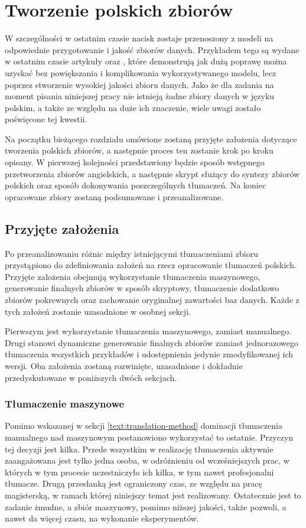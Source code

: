 \chapter{Tworzenie polskich zbiorów}
W szczególności w ostatnim czasie nacisk zostaje przenoszony z modeli na odpowiednie przygotowanie i jakość zbiorów danych. Przykładem tego są wydane w ostatnim czasie artykuły   oraz  , które demonstrują jak dużą poprawę można uzyskać bez powiększania i komplikowania wykorzystywanego modelu, lecz poprzez stworzenie wysokiej jakości zbioru danych. Jako że dla zadania  na moment pisania niniejszej pracy nie istnieją żadne zbiory danych w języku polskim, a także ze względu na duże ich znaczenie, wiele uwagi zostało poświęcone tej kwestii. 

Na początku bieżącego rozdziału omówione zostaną przyjęte założenia dotyczące tworzenia polskich zbiorów, a następnie proces ten zostanie krok po kroku opisany. W pierwszej kolejności przedstawiony będzie sposób wstępnego przetworzenia zbiorów angielskich, a następnie skrypt służący do syntezy zbiorów polskich oraz sposób dokonywania poszczególnych tłumaczeń. Na koniec opracowane zbiory zostaną podsumowane i przeanalizowane.

\section{Przyjęte założenia}
Po przeanalizowaniu różnic między istniejącymi tłumaczeniami zbioru  przystąpiono do zdefiniowania założeń na rzecz opracowanie tłumaczeń polskich. Przyjęte założenia obejmują wykorzystanie tłumaczenia maszynowego, generowanie finalnych zbiorów w sposób skryptowy, tłumaczenie dodatkowo zbiorów pokrewnych oraz zachowanie oryginalnej zawartości baz danych. Każde z tych założeń zostanie uzasadnione w osobnej sekcji.

 
 Pierwszym jest wykorzystanie tłumaczenia maszynowego, zamiast manualnego. Drugi stanowi dynamiczne generowanie finalnych zbiorów zamiast jednorazowego tłumaczenia wszystkich przykładów i udostępnienia jedynie zmodyfikowanej ich wersji. Oba założenia zostaną rozwinięte, uzasadnione i dokładnie przedyskutowane w poniższych dwóch sekcjach.

\subsection{Tłumaczenie maszynowe}
Pomimo wskazanej w sekcji \ref{text:translation-method} dominacji tłumaczenia manualnego nad maszynowym postanowiono wykorzystać to ostatnie. Przyczyn tej decyzji jest kilka. Przede wszystkim w realizację tłumaczenia aktywnie zaangażowana jest tylko jedna osoba, w odróżnieniu od wcześniejszych prac, w których w tym procesie uczestniczyło ich kilka, w tym nawet profesjonalni tłumacze. Drugą przesłanką jest ograniczony czas, ze względu na pracę magisterską, w ramach której niniejszy temat jest realizowany. Ostatecznie jest to zadanie żmudne, a zbiór maszynowy, pomimo niższej jakości, także pozwoli, a nawet da więcej czasu, na wykonanie eksperymentów.

